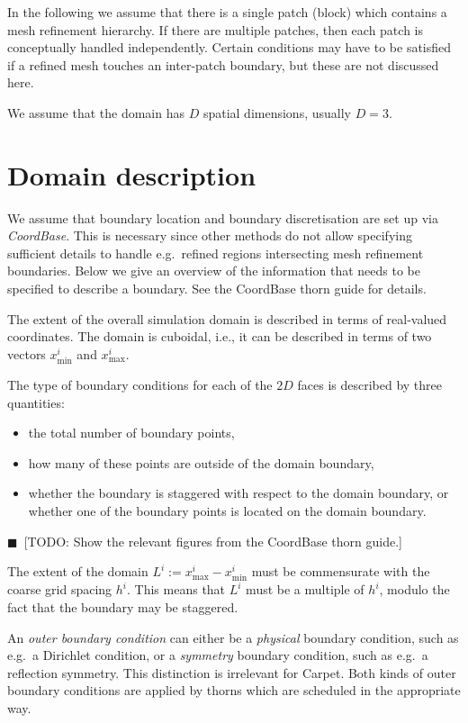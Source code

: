 \documentclass[oneside]{amsart}
\newcommand{\todo}[1]{{\color{blue}$\blacksquare$~\textsf{[TODO: #1]}}}
\begin{document}
In the following we assume that there is a single patch (block) which
contains a mesh refinement hierarchy.  If there are multiple patches,
then each patch is conceptually handled independently.  Certain
conditions may have to be satisfied if a refined mesh touches an
inter-patch boundary, but these are not discussed here.

We assume that the domain has $D$ spatial dimensions, usually $D=3$.



\section{Domain description}

We assume that boundary location and boundary discretisation are set
up via \emph{CoordBase}.  This is necessary since other methods do not
allow specifying sufficient details to handle e.g.\ refined regions
intersecting mesh refinement boundaries.  Below we give an overview
of the information that needs to be specified to describe a
boundary.  See the CoordBase thorn guide for details.

The extent of the overall simulation domain is described in terms of
real-valued coordinates.  The domain is cuboidal, i.e., it can be
described in terms of two vectors $x^i_\mathrm{min}$ and
$x^i_\mathrm{max}$.

The type of boundary conditions for each of the $2D$ faces is
described by three quantities:
\begin{itemize}
\item the total number of boundary points,
\item how many of these points are outside of the domain boundary,
\item whether the boundary is staggered with respect to the domain
  boundary, or whether one of the boundary points is located on the
  domain boundary.
\end{itemize}
\todo{Show the relevant figures from the CoordBase thorn guide.}

The extent of the domain $L^i := x^i_\mathrm{max} - x^i_\mathrm{min}$
must be commensurate with the coarse grid spacing $h^i$.  This means
that $L^i$ must be a multiple of $h^i$, modulo the fact that the
boundary may be staggered.

An \emph{outer boundary condition} can either be a \emph{physical}
boundary condition, such as e.g.\ a Dirichlet condition, or a
\emph{symmetry} boundary condition, such as e.g.\ a reflection
symmetry.  This distinction is irrelevant for Carpet.  Both kinds of
outer boundary conditions are applied by thorns which are scheduled in
the appropriate way.
\end{document}
